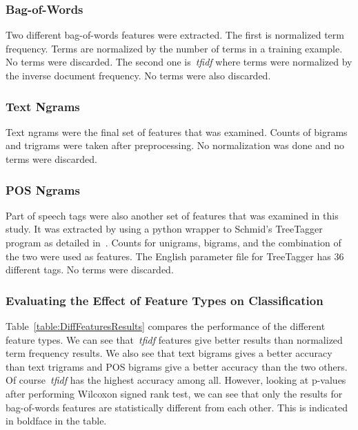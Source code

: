 \documentclass[a4paper]{llncs}
\begin{document}
%
%

\subsubsection{Bag-of-Words}

Two different bag-of-words features were extracted. The first is normalized term frequency. Terms are normalized by the number of terms in a training example. No terms were discarded. The second one is~\textit{tfidf} where terms were normalized by the inverse document frequency. No terms were also discarded. 

\subsubsection{Text Ngrams}
Text ngrams were the final set of features that was examined. Counts of bigrams and trigrams were taken after preprocessing. No normalization was done and no terms were discarded. 

\subsubsection{POS Ngrams}
Part of speech tags were also another set of features that was examined in this study. It was extracted by using a python wrapper to Schmid's TreeTagger program as detailed in~\cite{schmid1994probabilistic}. Counts for unigrams, bigrams, and the combination of the two were used as features. The English parameter file for TreeTagger has 36 different tags. No terms were discarded.

\subsubsection{Evaluating the Effect of Feature Types on Classification}
Table~\ref{table:DiffFeaturesResults} compares the performance of the different feature types. We can see that~\textit{tfidf} features give better results than normalized term frequency results. We also see that text bigrams gives a better accuracy than text trigrams and POS bigrams give a better accuracy than the two others. Of course~\textit{tfidf} has the highest accuracy among all. However, looking at p-values after performing Wilcoxon signed rank test, we can see that only the results for bag-of-words features are statistically different from each other. This is indicated in boldface in the table. 
\end{document}
